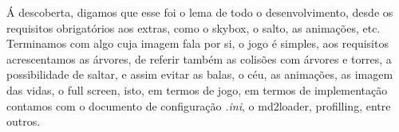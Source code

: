Á descoberta, digamos que esse foi o lema de todo o desenvolvimento, desde os requisitos obrigatórios aos extras, como o skybox, o salto, as animações, etc. Terminamos com algo cuja imagem fala por si, o jogo é simples, aos requisitos acrescentamos as árvores, de referir também as colisões com árvores e torres, a possibilidade de saltar, e assim evitar as balas, o céu, as animações, as imagem das vidas, o full screen, isto, em termos de jogo, em termos de implementação contamos com o documento de configuração \textit{.ini}, o md2loader, profilling, entre outros.
